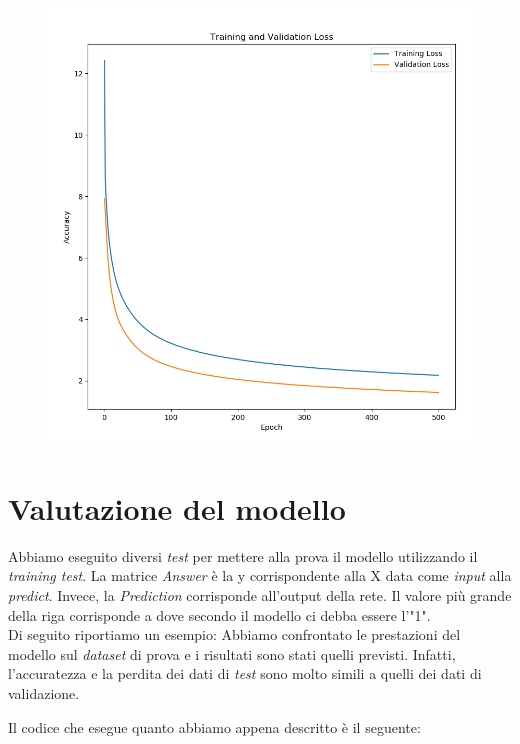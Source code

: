 \begin{figure}[H]
	\centering
	\includegraphics[scale=0.35]{./images/plot2.png}
\end{figure}

\section{Valutazione del modello}
Abbiamo eseguito diversi \textit{test} per mettere alla prova il modello utilizzando il \textit{training test}. La matrice \textit{Answer} è la y corrispondente alla X data come \textit{input} alla \textit{predict}. Invece, la \textit{Prediction} corrisponde all'output della rete. Il valore più grande della riga corrisponde a dove secondo il modello ci debba essere l'"1".\\
\newline
Di seguito riportiamo un esempio:
\vspace*{2ex}
\vspace*{2ex}
Abbiamo confrontato le prestazioni del modello sul \textit{dataset} di prova e i risultati sono stati quelli previsti. Infatti, l'accuratezza e la perdita dei dati di \textit{test} sono molto simili a quelli dei dati di validazione.
\vspace*{2ex}
\vspace*{2ex}

Il codice che esegue quanto abbiamo appena descritto è il seguente:
\vspace*{2ex}
\vspace*{2ex}